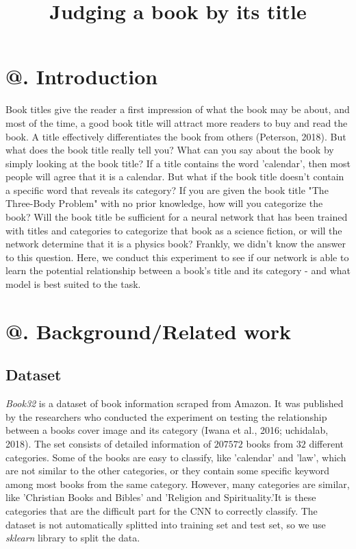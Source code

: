 \documentclass[jou,apacite, 10px]{apa6}
\title{Judging a book by its title}
\makeatletter
\newcommand*{\rom}[1]{\expandafter\@slowromancap\romannumeral #1@}
\makeatother
\begin{document}
\maketitle    
                        
\section{\rom{1}. Introduction}
Book titles give the reader a first impression of what the book may be about, and most of the time, a good book title will attract more readers to buy and read the book. A title effectively differentiates the book from others (Peterson, 2018). But what does the book title really tell you? What can you say about the book by simply looking at the book title? If a title contains the word 'calendar', then most people will agree that it is a calendar. But what if the book title doesn't contain a specific word that reveals its category? If you are given the book title "The Three-Body Problem" with no prior knowledge, how will you categorize the book? Will the book title be sufficient for a neural network that has been trained with titles and categories to categorize that book as a science fiction, or will the network determine that it is a physics book? Frankly, we didn't know the answer to this question. Here, we conduct this experiment to see if our network is able to learn the potential relationship between a book's title and its category - and what model is best suited to the task.

\section{\rom{2}. Background/Related work}

\subsection{Dataset}
\textit{Book32} is a dataset of book information scraped from Amazon. It was published by the researchers who conducted the experiment on testing the relationship between a books cover image and its category (Iwana et al., 2016; uchidalab, 2018). The set consists of detailed information of $207572$ books from $32$ different categories. Some of the books are easy to classify, like 'calendar' and 'law', which are not similar to the other categories, or they contain some specific keyword among most books from the same category. However, many categories are similar, like 'Christian Books and Bibles' and 'Religion and Spirituality.'It is these categories that are the difficult part for the CNN to correctly classify. The dataset is not automatically splitted into training set and test set, so we use \textit{sklearn} library to split the data.
\end{document}
